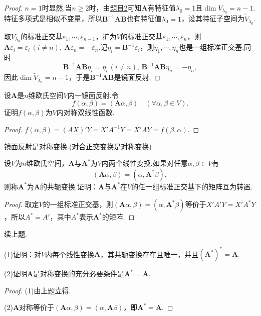 \begin{proof}
	$n=1$时显然.当$n\ge 2$时，由\hyperlink{Reflection}{题目2}可知$\bm A$有特征值$\lambda_0=1$且$\dim V_{\lambda_0}=n-1$.特征多项式是相似不变量，所以$\bm B^{-1}\bm A\bm B$也有特征值$\lambda_0=1$，设其特征子空间为$\widetilde{V}_{\lambda_0}$.

	取$V_{\lambda_0}$的标准正交基$\varepsilon_1,\cdots,\varepsilon_{n-1}$，扩为$V$的标准正交基$\varepsilon_1,\cdots,\varepsilon_n$，则$\bm A\varepsilon_i=\varepsilon_i\,(i\ne n),\ \bm A\varepsilon_n=-\varepsilon_n$.记$\eta_i=\bm B^{-1}\varepsilon_i$，则$\eta_1,\cdots,\eta_n$也是一组标准正交基.同时
	\[
		\bm B^{-1}\bm A\bm B\eta_i=\eta_i\,(i\ne n),\,\bm B^{-1}\bm A\bm B\eta_n=-\eta_n,
	\]
	因此$\dim\widetilde{V}_{\lambda_0}=n-1$，于是$\bm B^{-1}\bm A\bm B$是镜面反射.
\end{proof}
\begin{prob}[8]
	设$\bm A$是$n$维欧氏空间$V$内一镜面反射.令
	\[
		f(\alpha,\beta)=(\bm A\alpha,\beta)\quad(\forall\alpha,\beta\in V).
	\]
	证明$f(\alpha,\beta)$为$V$内对称双线性函数.
\end{prob}
\begin{proof}
	$f(\alpha,\beta)=(AX)'Y=X'A^{-1}Y=X'AY=f(\beta,\alpha)$.
\end{proof}
\begin{note}
	镜面反射是对称变换.(对合正交变换是对称变换)
\end{note}
\begin{prob}[10]
	设$V$为$n$维欧氏空间，$\bm A$与$\bm A^*$为$V$内两个线性变换.如果对任意$\alpha,\beta\in V$有
	\[
		(\bm A\alpha,\beta)=(\alpha,\bm A^*\beta),
	\]
	则称$\bm A^*$为$\bm A$的{\heiti 共轭变换}.证明：$\bm A$与$\bm A^*$在$V$的任一组标准正交基下的矩阵互为转置.
\end{prob}
\begin{proof}
	取定$V$的一组标准正交基，则$(\bm A\alpha,\beta)=(\alpha,\bm A^*\beta)$等价于$X'A'Y=X'A^*Y$，所以$A^*=A'$，其中$A^*$表示$\bm A^*$的矩阵.
\end{proof}
\begin{prob}[11]
	续上题.

	(1)证明：对$V$内每个线性变换$\bm A$，其共轭变换存在且唯一，并且$(\bm A^*)^*=\bm A$.

	(2)证明$\bm A$是对称变换的充分必要条件是$\bm A^*=\bm A$.
\end{prob}
\begin{proof}
	(1)由上题立得.

	(2)$\bm A$对称等价于$(\bm A\alpha,\beta)=(\alpha,\bm A\beta)$，即$\bm A^*=\bm A$.
\end{proof}
